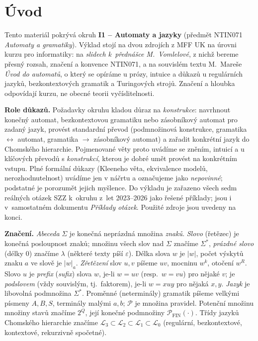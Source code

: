 \documentclass[11pt,a4paper]{article}
\begin{document}
\maketitle
\tableofcontents
\bigskip

\section*{Úvod}

Tento materiál pokrývá okruh \textbf{I1 -- Automaty a jazyky} (předmět NTIN071 \emph{Automaty a gramatiky}). Výklad stojí na dvou zdrojích z MFF UK na úrovni kurzu pro informatiky: na \emph{slidech k~přednášce M.~Vomlelové}, z nichž bereme přesný rozsah, značení a konvence NTIN071, a na souvislém textu M.~Mareše \emph{Úvod do automatů}, o který se opíráme u prózy, intuice a důkazů u regulárních jazyků, bezkontextových gramatik a Turingových strojů. Značení a hloubka odpovídají kurzu, ne obecné teorii vyčíslitelnosti.

\noindent\textbf{Role důkazů.} Požadavky okruhu kladou důraz na \emph{konstrukce}: navrhnout konečný automat, bezkontextovou gramatiku nebo zásobníkový automat pro zadaný jazyk, provést standardní převod (podmnožinová konstrukce, gramatika $\leftrightarrow$ automat, gramatika $\to$ zásobníkový automat) a zařadit konkrétní jazyk do Chomského hierarchie. Pojmenované věty proto uvádíme se zněním, intuicí a u klíčových převodů s \emph{konstrukcí}, kterou je dobré umět provést na konkrétním vstupu. Plné formální důkazy (Kleeneho věta, ekvivalence modelů, nerozhodnutelnost) uvádíme jen v náčrtu a označujeme jako \emph{nepovinné}; podstatné je porozumět jejich myšlence. Do výkladu je zařazeno všech sedm reálných otázek SZZ k~okruhu z~let 2023--2026 jako řešené příklady; jsou i v~samostatném dokumentu \emph{Příklady otázek}. Použité zdroje jsou uvedeny na konci.

\medskip
\noindent\textbf{Značení.} \emph{Abeceda} $\Sigma$ je konečná neprázdná množina \emph{znaků}. \emph{Slovo} (řetězec) je konečná posloupnost znaků; množinu všech slov nad $\Sigma$ značíme $\Sigma^*$, \emph{prázdné slovo} (délky $0$) značíme $\lambda$ (některé texty píší $\varepsilon$). Délka slova $w$ je $|w|$, počet výskytů znaku $a$ ve slově je $|w|_a$. \emph{Zřetězení} slov $u,v$ píšeme $uv$, mocninu $w^k$, otočení $w^R$. Slovo $u$ je \emph{prefix} (\emph{sufix}) slova $w$, je-li $w=uv$ (resp.\ $w=vu$) pro nějaké $v$; je \emph{podslovem} (vždy souvislým, tj.\ faktorem), je-li $w=xuy$ pro nějaká $x,y$. \emph{Jazyk} je libovolná podmnožina $\Sigma^*$. Proměnné (neterminály) gramatik píšeme velkými písmeny $A,B,S$, terminály malými $a,b$; $\mathcal P$ je množina pravidel. Potenční množinu množiny stavů značíme $2^Q$, její konečné podmnožiny $\mathcal P_{\mathrm{FIN}}(\cdot)$. Třídy jazyků Chomského hierarchie značíme $\mathcal L_3\subset\mathcal L_2\subset\mathcal L_1\subset\mathcal L_0$ (regulární, bezkontextové, kontextové, rekurzivně spočetné).
\end{document}

